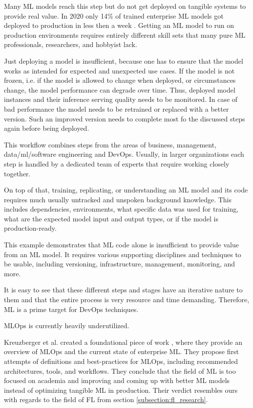 Many ML models reach this step but do not get deployed on tangible systems to provide real value.
In 2020 only 14\% of trained enterprise ML models got deployed to production in less then a week \cite{algorithmia_state_of_enterprise_ml}.
Getting an ML model to run on production environments requires entirely different skill sets
that many pure ML professionals, researchers, and hobbyist lack.

Just deploying a model is insufficient, because one has to ensure that the model works as intended for expected and unexpected use cases.
If the model is not frozen, i.e. if the model is allowed to change when deployed, or circumstances change, the model performance can degrade over time.
Thus, deployed model instances and their inference serving quality needs to be monitored.
In case of bad performance the model needs to be retrained or replaced with a better version.
Such an improved version needs to complete most fo the discussed steps again before being deployed.

This workflow combines steps from the areas of business, management, data/ml/software engineering and DevOps.
Usually, in larger organizations each step is handled by a dedicated team of experts that require working 
closely together.

On top of that, training, replicating, or understanding an ML model and its code
requires much usually untracked and unspoken background knowledge.
This includes dependencies, environments, what specific data was used for training,
what are the expected model input and output types, or if the model is production-ready.

This example demonstrates that ML code alone is insufficient to provide value from an ML model.
It requires various supporting disciplines and techniques to be usable,
including versioning, infrastructure, management, monitoring, and more.

It is easy to see that these different steps and stages have an iterative nature to them
and that the entire process is very resource and time demanding.
Therefore, ML is a prime target for DevOps techniques.

MLOps is currently heavily underutilized.

Kreuzberger et al. created a foundational piece of work \cite{paper:mlops},
where they provide an overview of MLOps and the current state of enterprise ML.
They propose first attempts of definitions and best-practices for MLOps, including 
recommended architectures, tools, and workflows.
They conclude that the field of ML is too focused on academia and improving and coming up with better ML models
instead of optimizing tangible ML in production.
Their verdict resembles ours with regards to the field of FL from section \ref{subsection:fl_research}.
